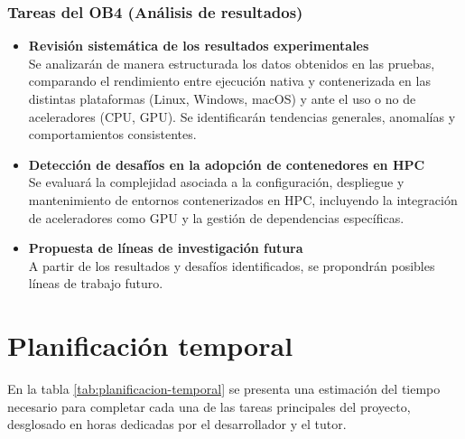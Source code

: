 \subsubsection{Tareas del OB4 (Análisis de resultados)}\label{subsubsec:tareas_ob4}

\begin{itemize}
    \item \textbf{Revisión sistemática de los resultados experimentales} \\
          Se analizarán de manera estructurada los datos obtenidos en las pruebas, comparando el rendimiento entre ejecución nativa y contenerizada en las distintas plataformas (Linux, Windows, macOS) y ante el uso o no de aceleradores (CPU, GPU). Se identificarán tendencias generales, anomalías y comportamientos consistentes.

    \item \textbf{Detección de desafíos en la adopción de contenedores en HPC} \\
          Se evaluará la complejidad asociada a la configuración, despliegue y mantenimiento de entornos contenerizados en HPC, incluyendo la integración de aceleradores como GPU y la gestión de dependencias específicas.

    \item \textbf{Propuesta de líneas de investigación futura} \\
          A partir de los resultados y desafíos identificados, se propondrán posibles líneas de trabajo futuro.
\end{itemize}

\section{Planificación temporal}

En la tabla \ref{tab:planificacion-temporal} se presenta una estimación del tiempo necesario para completar cada una de las tareas principales del proyecto, desglosado en horas dedicadas por el desarrollador y el tutor.


